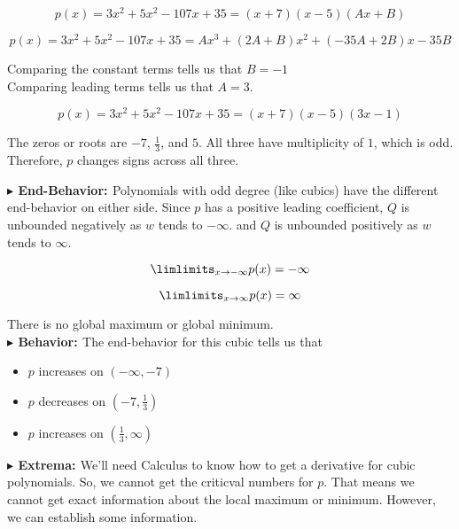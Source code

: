 \documentclass{ximera}
\begin{document}
\begin{exercise}
\[
p(x) = 3 x^2 + 5 x^2 - 107 x + 35 = (x+7)(x-5)(A x + B)
\]




\[
p(x) = 3 x^2 + 5 x^2 - 107 x + 35 = A x^3 + (2 A + B) x^2 + (-35 A + 2 B) x - 35 B 
\]


Comparing the constant terms tells us that $B = -1$ \\



Comparing leading terms tells us that $A = 3$.




\[
p(x) = 3 x^2 + 5 x^2 - 107 x + 35 = (x+7)(x-5)(3 x - 1)
\]





The zeros or roots are $-7$, $\frac{1}{3}$, and $5$.  All three have multiplicity of $1$, which is odd.  Therefore, $p$ changes signs across all three.










\textbf{\textcolor{blue!55!black}{$\blacktriangleright$ End-Behavior: }} Polynomials with odd degree (like cubics) have the different end-behavior on either side.  Since $p$ has a positive leading coefficient, $Q$ is unbounded negatively as $w$ tends to $-\infty$. and $Q$ is unbounded positively as $w$ tends to $\infty$.

\[
\limlimits_{x \to -\infty} p(x) = -\infty
\]


\[
\limlimits_{x \to \infty} p(x) = \infty
\]


There is no global maximum or global minimum. \\



\textbf{\textcolor{blue!55!black}{$\blacktriangleright$ Behavior: }}  The end-behavior for this cubic tells us that 



\begin{itemize}
\item $p$ increases on $(-\infty, -7)$ 
\item $p$ decreases on $\left( -7, \frac{1}{3} \right)$
\item $p$ increases on $\left( \frac{1}{3}, \infty \right)$
\end{itemize}




\textbf{\textcolor{blue!55!black}{$\blacktriangleright$ Extrema: }}  We'll need Calculus to know how to get a derivative for cubic polynomials.  So, we cannot get the criticval numbers for $p$.  That means we cannot get exact information about the local maximum or minimum.  However, we can establish some information.






\end{exercise}
\end{document}
